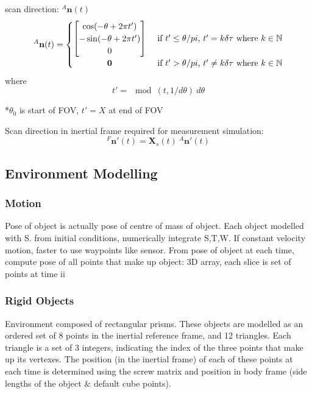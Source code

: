 scan direction: $^{A}\mathbf{n}(t)$
\begin{equation}
^{A}\mathbf{n}(t) =
	\begin{cases} 
	      \hfill \begin{bmatrix}
	      		\cos(-\theta + 2\pi t') \\
	      		-\sin(-\theta + 2\pi t') \\
	      		0
	      	\end{bmatrix}    \hfill & \text{ if $t' \leq \theta/pi$, $t' = k\delta\tau$ where $k \in \mathbb{N}$} \\
	      \hfill \mathbf{0} \hfill & \text{ if $t' > \theta/pi$, $t' \neq k\delta\tau$ where $k \in \mathbb{N}$} \\
	\end{cases} 
\end{equation}
where
\begin{equation}
t' = \mod(t,1/d\theta)\:d\theta
\end{equation}

*$\theta_0$ is start of FOV, $t'=X$ at end of FOV

Scan direction in inertial frame required for measurement simulation:
\begin{equation}
	{^{F}\mathbf{n'}(t)} = \mathbf{X}_s(t)\:{^{A}\mathbf{n'}(t)}
\end{equation}

\subsection{Environment Modelling}
\subsubsection{Motion}
Pose of object is actually pose of centre of mass of object.
Each object modelled with S. from initial conditions, numerically integrate S,T,W. If constant velocity motion, faster to use waypoints like sensor.
From pose of object at each time, compute pose of all points that make up object: 3D array, each slice is set of points at time ii

\subsubsection{Rigid Objects}
Environment composed of rectangular prisms. These objects are modelled as an ordered set of 8 points in the inertial reference frame, and 12 triangles. Each triangle is a set of 3 integers, indicating the index of the three points that make up its vertexes.
The position (in the inertial frame) of each of these points at each time is determined using the screw matrix and position in body frame (side lengths of the object \& default cube points).

